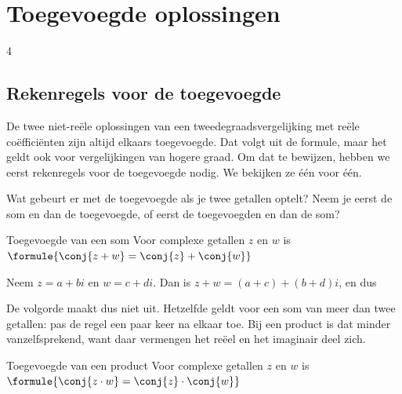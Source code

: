 \begin{oefeningen}

\end{oefeningen}

\section{Toegevoegde oplossingen}

\begin{alleenvoor}{4}
\subsection{Rekenregels voor de toegevoegde}

De twee niet-reële oplossingen van een tweedegraadsvergelijking met reële coëfficiënten zijn altijd elkaars toegevoegde. Dat volgt uit de formule, maar het geldt ook voor vergelijkingen van hogere graad. Om dat te bewijzen, hebben we eerst rekenregels voor de toegevoegde nodig. We bekijken ze één voor één.

Wat gebeurt er met de toegevoegde als je twee getallen optelt? Neem je eerst de som en dan de toegevoegde, of eerst de toegevoegden en dan de som?

\begin{theorie}
\begin{stelling}{Toegevoegde van een som}
Voor complexe getallen $z$ en $w$ is \quad $\formule{\conj{z + w} = \conj{z} + \conj{w}}$
\end{stelling}

\begin{bewijs}
Neem $z = a + bi$ en $w = c + di$. Dan is $z + w = (a + c) + (b + d)i$, en dus
\end{bewijs}
\end{theorie}

De volgorde maakt dus niet uit. Hetzelfde geldt voor een som van meer dan twee getallen: pas de regel een paar keer na elkaar toe. Bij een product is dat minder vanzelfsprekend, want daar vermengen het reëel en het imaginair deel zich.

\begin{theorie}
\begin{stelling}{Toegevoegde van een product}
Voor complexe getallen $z$ en $w$ is \quad $\formule{\conj{z \cdot w} = \conj{z} \cdot \conj{w}}$
\end{stelling}


\end{theorie}
\end{alleenvoor}
